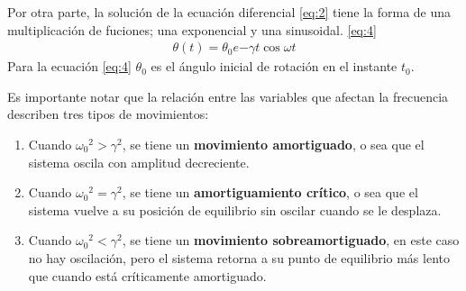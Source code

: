 \documentclass[spanish,notitlepage,letterpaper, 12pt]{article}
\begin{document}
Por otra parte, la solución de la ecuación diferencial \eqref{eq:2} tiene la forma de una multiplicación de fuciones; una exponencial y una sinusoidal. \eqref{eq:4}
\begin{align}\label{eq:4}
    \theta(t)=\theta_0e{-\gamma t}\cos{\omega t}
\end{align}
Para la ecuación \eqref{eq:4} $\theta_0$ es el ángulo inicial de rotación en el instante $t_0$.\par
\bigskip
Es importante notar que la relación entre las variables que afectan la frecuencia describen tres tipos de movimientos:
\begin{enumerate}
    \item Cuando ${\omega_0}^2>\gamma^2$, se tiene un \textbf{movimiento amortiguado}, o sea que el sistema oscila con amplitud decreciente.
    \item Cuando ${\omega_0}^2=\gamma^2$, se tiene un \textbf{amortiguamiento crítico}, o sea que el sistema vuelve a su posición de equilibrio sin oscilar cuando se le desplaza.
    \item Cuando ${\omega_0}^2<\gamma^2$, se tiene un \textbf{movimiento sobreamortiguado}, en este caso no hay oscilación, pero el sistema retorna a su punto de equilibrio más lento que cuando está críticamente amortiguado.
\end{enumerate}
\end{document}
